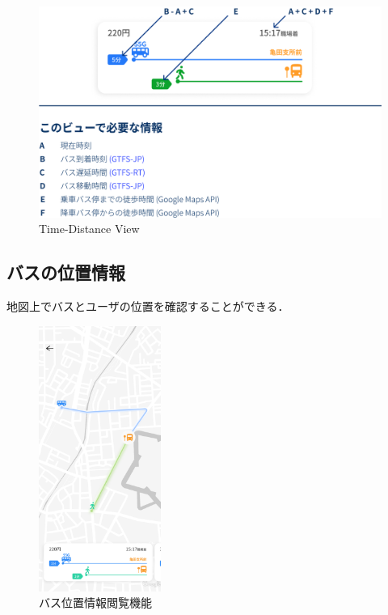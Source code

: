\begin{figure}[htbp]
    \centering
    \includegraphics[width=12cm]{images/feature_timedistanceview.png}
    \caption{Time-Distance View}
    \label{fig:feature_timedistanceview}
\end{figure}

\subsection{バスの位置情報}
地図上でバスとユーザの位置を確認することができる．

\begin{figure}[htbp]
    \centering
    \includegraphics[width=4cm]{images/feature_routeview.png}
    \caption{バス位置情報閲覧機能}
    \label{fig:feature_routeview}
\end{figure}
